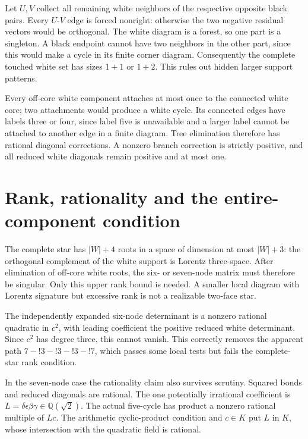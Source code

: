 \documentclass[
  10pt,
]{report}
\begin{document}
Let \(U,V\) collect all remaining white neighbors of the respective
opposite black pairs. Every \(U\)-\(V\) edge is forced nonright:
otherwise the two negative residual vectors would be orthogonal. The
white diagram is a forest, so one part is a singleton. A black endpoint
cannot have two neighbors in the other part, since this would make a
cycle in its finite corner diagram. Consequently the complete touched
white set has sizes \(1+1\) or \(1+2\). This rules out hidden larger
support patterns.

Every off-core white component attaches at most once to the connected
white core; two attachments would produce a white cycle. Its connected
edges have labels three or four, since label five is unavailable and a
larger label cannot be attached to another edge in a finite diagram.
Tree elimination therefore has rational diagonal corrections. A nonzero
branch correction is strictly positive, and all reduced white diagonals
remain positive and at most one.

\section{Rank, rationality and the entire-component
condition}\label{rank-rationality-and-the-entire-component-condition}

The complete star has \(|W|+4\) roots in a space of dimension at most
\(|W|+3\): the orthogonal complement of the white support is Lorentz
three-space. After elimination of off-core white roots, the six- or
seven-node matrix must therefore be singular. Only this upper rank bound
is needed. A smaller local diagram with Lorentz signature but excessive
rank is not a realizable two-face star.

The independently expanded six-node determinant is a nonzero rational
quadratic in \(c^2\), with leading coefficient the positive reduced
white determinant. Since \(c^2\) has degree three, this cannot vanish.
This correctly removes the apparent path \(7\!-!3\!-!3\!-!3\!-!7\),
which passes some local tests but fails the complete-star rank
condition.

In the seven-node case the rationality claim also survives scrutiny.
Squared bonds and reduced diagonals are rational. The one potentially
irrational coefficient is
\(L=\delta\epsilon\beta\gamma\in\mathbb Q(\sqrt2)\). The actual
five-cycle has product a nonzero rational multiple of \(Lc\). The
arithmetic cyclic-product condition and \(c\in K\) put \(L\) in \(K\),
whose intersection with the quadratic field is rational.
\end{document}
